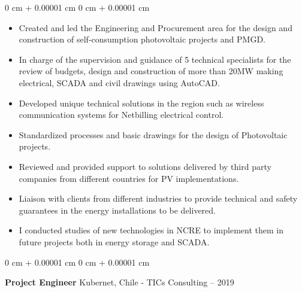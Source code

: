 \documentclass[10pt, letterpaper]{article}
\newenvironment{highlights}{
    \begin{itemize}[
        topsep=0.10 cm,
        parsep=0.10 cm,
        partopsep=0pt,
        itemsep=0pt,
        leftmargin=0 cm + 10pt
    ]
}{
    \end{itemize}
} %
\newenvironment{onecolentry}{
    \begin{adjustwidth}{
        0 cm + 0.00001 cm
    }{
        0 cm + 0.00001 cm
    }
}{
    \end{adjustwidth}
} %
\newenvironment{twocolentry}[2][]{
    \onecolentry
    \def\secondColumn{#2}
    \setcolumnwidth{\fill, 4.5 cm}
    \begin{paracol}{2}
}{
    \switchcolumn \raggedleft \secondColumn
    \end{paracol}
    \endonecolentry
} %
\begin{document}
        \vspace{0.10 cm}
        \begin{onecolentry}
            \begin{highlights}
                \item Created and led the Engineering and Procurement area for the design and construction of self-consumption photovoltaic projects and PMGD.
                \item In charge of the supervision and guidance of 5 technical specialists for the review of budgets, design and construction of more than 20MW making electrical, SCADA and civil drawings using AutoCAD.
                \item Developed unique technical solutions in the region such as wireless communication systems for Netbilling electrical control.
                \item Standardized processes and basic drawings for the design of Photovoltaic projects.
                \item Reviewed and provided support to solutions delivered by third party companies from different countries for PV implementations.
                \item Liaison with clients from different industries to provide technical and safety guarantees in the energy installations to be delivered.
                \item I conducted studies of new technologies in NCRE to implement them in future projects both in energy storage and SCADA.

            \end{highlights}
        \end{onecolentry}

\vspace{0.2 cm}

        \begin{twocolentry}{
         2018 – 2019
        }
            \textbf{Project Engineer} Kubernet, Chile - TICs Consulting\end{twocolentry}
\end{document}
